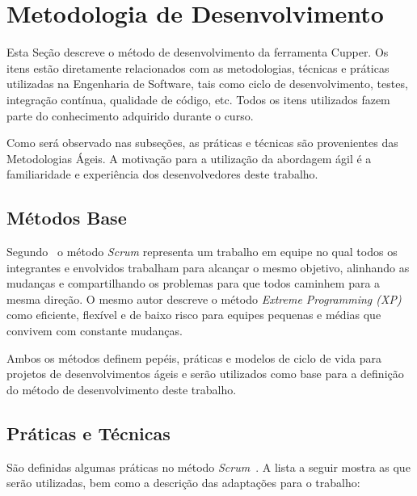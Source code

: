 \section{Metodologia de Desenvolvimento}
\label{sec:desenvolvimento}

Esta Seção descreve o método de desenvolvimento da ferramenta Cupper.
Os itens estão diretamente relacionados com as metodologias, técnicas e
práticas utilizadas na Engenharia de Software, tais como ciclo de
desenvolvimento, testes, integração contínua, qualidade de código, etc.
Todos os itens utilizados fazem parte do conhecimento adquirido durante
o curso.

Como será observado nas subseções, as práticas e técnicas são provenientes
das Metodologias Ágeis. A motivação para a utilização da abordagem
ágil é a familiaridade e experiência dos desenvolvedores deste trabalho.

\subsection{Métodos Base}
\label{sec:metodo_base}

Segundo~ o método \textit{Scrum} representa um trabalho
em equipe no qual todos os integrantes e envolvidos trabalham para alcançar
o mesmo objetivo, alinhando as mudanças e compartilhando os problemas para que
todos caminhem para a mesma direção. O mesmo autor descreve o método
\textit{Extreme Programming (XP)} como eficiente, flexível e de baixo risco para equipes
pequenas e médias que convivem com constante mudanças.

Ambos os métodos definem pepéis, práticas e modelos de ciclo de vida para
projetos de desenvolvimentos ágeis e serão utilizados como base para a definição
do método de desenvolvimento deste trabalho.

\subsection{Práticas e Técnicas}
\label{sec:praticas_tecnicas}

São definidas algumas práticas no método \textit{Scrum}~\cite{gutierrez:2009}. A lista a seguir
mostra as que serão utilizadas, bem como a descrição das adaptações para o trabalho:

